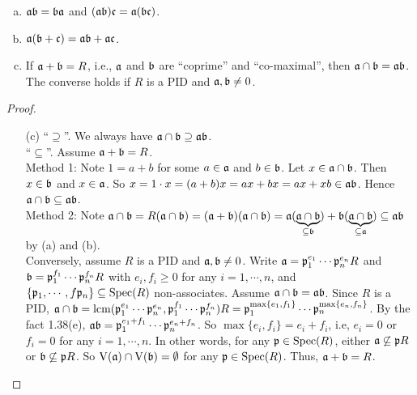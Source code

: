 \begin{proposition}
    \begin{enumerate}[(a)]
        \item $\mathfrak{a} \mathfrak{b} = \mathfrak{b} \mathfrak{a}$ and $(\mathfrak{a} \mathfrak{b})\mathfrak{c} = \mathfrak{a}(\mathfrak{b}\mathfrak{c})$.
        \item $\mathfrak{a}(\mathfrak{b} + \mathfrak{c}) = \mathfrak{a} \mathfrak{b} + \mathfrak{a} \mathfrak{c}$.
        \item If $\mathfrak{a} + \mathfrak{b} = R$, i.e., $\mathfrak{a}$ and $\mathfrak{b}$ are ``coprime'' and ``co-maximal'', then $\mathfrak{a} \cap \mathfrak{b} = \mathfrak{a} \mathfrak{b}$. \\
            The converse holds if $R$ is a PID and $\mathfrak{a},\mathfrak{b} \neq 0$.
    \end{enumerate}
\end{proposition}

\begin{proof}
    \begin{enumerate}
        \item [(c)]
            ``$\supseteq$''. We always have $\mathfrak{a} \cap \mathfrak{b} \supseteq \mathfrak{a} \mathfrak{b}$. \\
            ``$\subseteq$''. Assume $\mathfrak{a} + \mathfrak{b} = R$.  \\
            Method 1: Note $1 = a+b$ for some $a \in \mathfrak{a}$ and $b \in \mathfrak{b}$. Let $x \in \mathfrak{a} \cap \mathfrak{b}$. Then $x \in \mathfrak{b}$ and $x \in \mathfrak{a}$. So $x = 1 \cdot x = (a+b)x = ax + bx = ax + xb \in \operatorname{\mathfrak{a} \mathfrak{b}}$. Hence $\mathfrak{a} \cap \mathfrak{b} \subseteq \mathfrak{a} \mathfrak{b}$. \\
            Method 2: Note $\mathfrak{a} \cap \mathfrak{b} = R(\mathfrak{a} \cap \mathfrak{b}) = (\mathfrak{a} + \mathfrak{b})(\mathfrak{a} \cap \mathfrak{b}) = \mathfrak{a}(\underbrace{\mathfrak{a} \cap \mathfrak{b}}_{\subseteq \mathfrak{b}}) + \mathfrak{b}(\underbrace{\mathfrak{a} \cap \mathfrak{b}}_{\subseteq \mathfrak{a}}) \subseteq \mathfrak{a} \mathfrak{b}$ by (a) and (b). \\
            Conversely, assume $R$ is a PID and $\mathfrak{a},\mathfrak{b} \neq 0$. Write $\mathfrak{a} = \mathfrak{p}_1^{e_1} \cdots \mathfrak{p}_n^{e_n} R$ and $\mathfrak{b} = \mathfrak{p}_1^{f_1} \cdots \mathfrak{p}_n^{f_n}R$ with $e_i,f_i \geq 0$ for any $i = 1,\cdots,n$, and $\{\mathfrak{p}_1,\cdots,f\mathfrak{p}_n\} \subseteq \operatorname{Spec}(R)$ non-associates. Assume $\mathfrak{a} \cap \mathfrak{b} = \mathfrak{a} \mathfrak{b}$. Since $R$ is a PID, $\mathfrak{a} \cap \mathfrak{b} = \operatorname{lcm}(\mathfrak{p}_1^{e_1} \cdots \mathfrak{p}_n^{e_n},\mathfrak{p}_1^{f_1} \cdots \mathfrak{p}_n^{f_n})R = \mathfrak{p}_1^{\max\{e_1,f_1\}} \cdots \mathfrak{p}_n^{\max\{e_n,f_n\}}$. By the fact 1.38(e), $\mathfrak{a}\mathfrak{b} = \mathfrak{p}_1^{e_1+f_1} \cdots \mathfrak{p}_n^{e_n+f_n}$. So $\max\{e_i,f_i\} = e_i + f_i$, i.e, $e_i = 0$ or $f_i = 0$ for any $i = 1,\cdots,n$. In other words, for any $\mathfrak{p} \in \operatorname{Spec}(R)$, either $\mathfrak{a} \not \subseteq \mathfrak{p} R$ or $\mathfrak{b} \not \subseteq \mathfrak{p} R$. So $\operatorname{V}(\mathfrak{a}) \cap \operatorname{V}(\mathfrak{b}) = \emptyset$ for any $\mathfrak{p} \in \operatorname{Spec}(R)$. Thus, $\mathfrak{a} + \mathfrak{b} = R$.
    \end{enumerate}
\end{proof}


